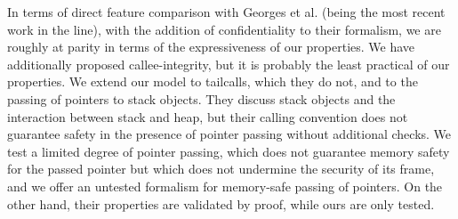 \documentclass[10pt,conference]{ieeetran}%
\theoremstyle{definition}
\begin{document}
In terms of direct feature comparison with Georges et al. (being the most
recent work in the line), with the addition of confidentiality to their formalism, we
are roughly at parity in terms of the expressiveness of our properties.
We have additionally proposed callee-integrity, but it is probably the least
practical of our properties. We extend our model to tailcalls, which they do
not, and to the passing of pointers to stack objects. They discuss stack objects
and the interaction between stack and heap, but their calling convention does not
guarantee safety in the presence of pointer passing without additional checks.
We test a limited degree of pointer passing, which does not guarantee memory
safety for the passed pointer but which does not undermine the security of its
frame, and we offer an untested formalism for memory-safe passing of pointers.
On the other hand, their properties are validated by proof, while ours are
only tested.

%

\end{document}
